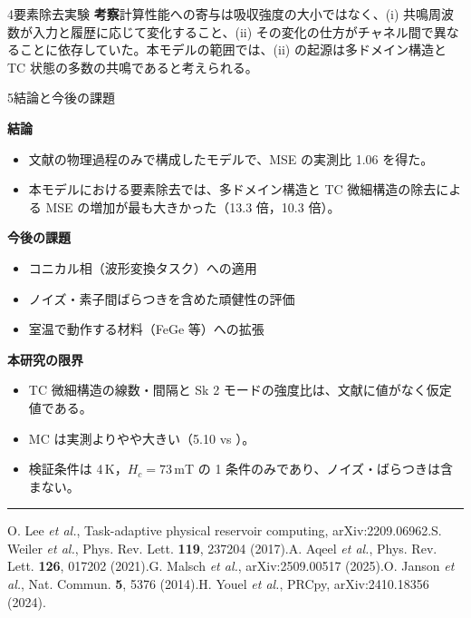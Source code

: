 \documentclass{article}
\newcommand\rTC{10.3}     %
\newcommand\rMD{13.3}     %
\newcommand\MCfull{5.10}
\newcommand\gapfull{1.06}   %
\newcommand\emk[1]{\textbf{#1}}
\newlength\gap   \setlength\gap{11mm}
\newlength\halfw \setlength\halfw{\dimexpr(\textwidth-\gap)/2\relax}
\begin{document}
\begin{minipage}[t]{\halfw}
\begin{secbox}{4\enspace 要素除去実験}
\vspace{5mm}
\emk{考察}\quad 計算性能への寄与は吸収強度の大小ではなく、(i) 共鳴周波数が入力と履歴に応じて変化すること、(ii) その変化の仕方がチャネル間で異なることに依存していた。本モデルの範囲では、(ii) の起源は多ドメイン構造と TC 状態の多数の共鳴であると考えられる。
\end{secbox}

\vspace{\gap}

\begin{secbox}{5\enspace 結論と今後の課題}
\begin{minipage}[t]{0.48\linewidth}\vspace{0pt}
\emk{結論}
\begin{itemize}
  \item 文献の物理過程のみで構成したモデルで、MSE の実測比 \gapfull{} を得た。
  \item 本モデルにおける要素除去では、多ドメイン構造と TC 微細構造の除去による MSE の増加が最も大きかった（\rMD{} 倍，\rTC{} 倍）。
\end{itemize}
\vspace{2mm}
\emk{今後の課題}
\begin{itemize}
  \item コニカル相（波形変換タスク）への適用
  \item ノイズ・素子間ばらつきを含めた頑健性の評価
  \item 室温で動作する材料（FeGe 等）への拡張
\end{itemize}
\end{minipage}\hfill
\begin{minipage}[t]{0.48\linewidth}\vspace{0pt}
\emk{本研究の限界}
\begin{itemize}
  \item TC 微細構造の線数・間隔と Sk 2 モードの強度比は、文献に値がなく仮定値である。
  \item MC は実測よりやや大きい（\MCfull{} vs \MCexp）。
  \item 検証条件は 4\,K，$H_c=73$\,mT の 1 条件のみであり、ノイズ・ばらつきは含まない。
\end{itemize}
\end{minipage}

\vspace{5mm}
{\color{cMain!35}\rule{\linewidth}{0.8pt}}\par
{\fontsize{15}{21}\selectfont
[1] O. Lee \textit{et al.}, Task-adaptive physical reservoir computing, arXiv:2209.06962.\quad
[2] S. Weiler \textit{et al.}, Phys. Rev. Lett. \textbf{119}, 237204 (2017).\quad
[3] A. Aqeel \textit{et al.}, Phys. Rev. Lett. \textbf{126}, 017202 (2021).\quad
[4] G. Malsch \textit{et al.}, arXiv:2509.00517 (2025).\quad
[5] O. Janson \textit{et al.}, Nat. Commun. \textbf{5}, 5376 (2014).\quad
[6] H. Youel \textit{et al.}, PRCpy, arXiv:2410.18356 (2024).\par}
\end{secbox}

\end{minipage}
\end{document}

